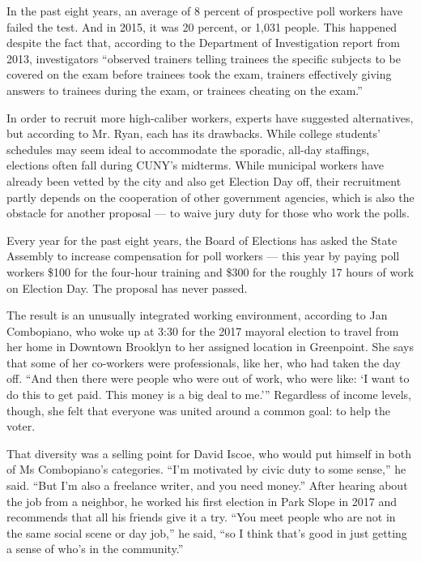 In the past eight years, an average of 8 percent of prospective poll
workers have failed the test. And in 2015, it was 20 percent, or 1,031
people. This happened despite the fact that, according to the Department
of Investigation report from 2013, investigators ``observed trainers
telling trainees the specific subjects to be covered on the exam before
trainees took the exam, trainers effectively giving answers to trainees
during the exam, or trainees cheating on the exam.''

In order to recruit more high-caliber workers, experts have suggested
alternatives, but according to Mr. Ryan, each has its drawbacks. While
college students' schedules may seem ideal to accommodate the sporadic,
all-day staffings, elections often fall during CUNY's midterms. While
municipal workers have already been vetted by the city and also get
Election Day off, their recruitment partly depends on the cooperation of
other government agencies, which is also the obstacle for another
proposal --- to waive jury duty for those who work the polls.

Every year for the past eight years, the Board of Elections has asked
the State Assembly to increase compensation for poll workers --- this
year by paying poll workers \$100 for the four-hour training and \$300
for the roughly 17 hours of work on Election Day. The proposal has never
passed.

The result is an unusually integrated working environment, according to
Jan Combopiano, who woke up at 3:30 for the 2017 mayoral election to
travel from her home in Downtown Brooklyn to her assigned location in
Greenpoint. She says that some of her co-workers were professionals,
like her, who had taken the day off. ``And then there were people who
were out of work, who were like: `I want to do this to get paid. This
money is a big deal to me.''' Regardless of income levels, though, she
felt that everyone was united around a common goal: to help the voter.

That diversity was a selling point for David Iscoe, who would put
himself in both of Ms Combopiano's categories. ``I'm motivated by civic
duty to some sense,'' he said. ``But I'm also a freelance writer, and
you need money.'' After hearing about the job from a neighbor, he worked
his first election in Park Slope in 2017 and recommends that all his
friends give it a try. ``You meet people who are not in the same social
scene or day job,'' he said, ``so I think that's good in just getting a
sense of who's in the community.''

